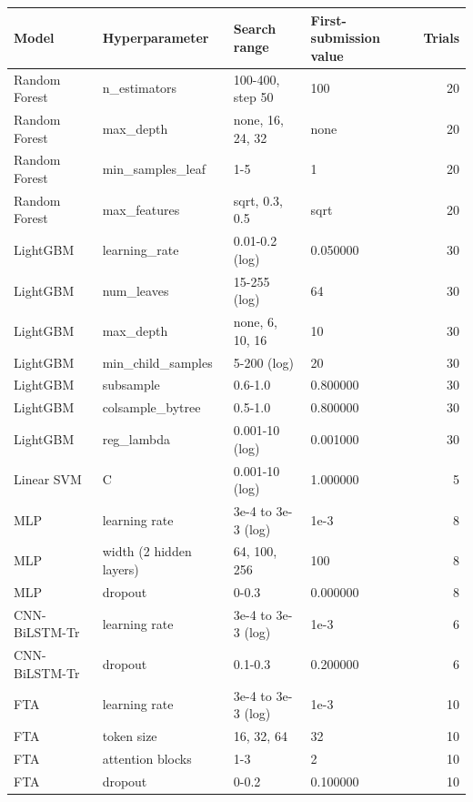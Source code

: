 \begin{tabular}{llllr}
\toprule
Model & Hyperparameter & Search range & First-submission value & Trials \\
\midrule
Random Forest & n\_estimators & 100-400, step 50 & 100 & 20 \\
Random Forest & max\_depth & none, 16, 24, 32 & none & 20 \\
Random Forest & min\_samples\_leaf & 1-5 & 1 & 20 \\
Random Forest & max\_features & sqrt, 0.3, 0.5 & sqrt & 20 \\
LightGBM & learning\_rate & 0.01-0.2 (log) & 0.050000 & 30 \\
LightGBM & num\_leaves & 15-255 (log) & 64 & 30 \\
LightGBM & max\_depth & none, 6, 10, 16 & 10 & 30 \\
LightGBM & min\_child\_samples & 5-200 (log) & 20 & 30 \\
LightGBM & subsample & 0.6-1.0 & 0.800000 & 30 \\
LightGBM & colsample\_bytree & 0.5-1.0 & 0.800000 & 30 \\
LightGBM & reg\_lambda & 0.001-10 (log) & 0.001000 & 30 \\
Linear SVM & C & 0.001-10 (log) & 1.000000 & 5 \\
MLP & learning rate & 3e-4 to 3e-3 (log) & 1e-3 & 8 \\
MLP & width (2 hidden layers) & 64, 100, 256 & 100 & 8 \\
MLP & dropout & 0-0.3 & 0.000000 & 8 \\
CNN-BiLSTM-Tr & learning rate & 3e-4 to 3e-3 (log) & 1e-3 & 6 \\
CNN-BiLSTM-Tr & dropout & 0.1-0.3 & 0.200000 & 6 \\
FTA & learning rate & 3e-4 to 3e-3 (log) & 1e-3 & 10 \\
FTA & token size & 16, 32, 64 & 32 & 10 \\
FTA & attention blocks & 1-3 & 2 & 10 \\
FTA & dropout & 0-0.2 & 0.100000 & 10 \\
\bottomrule
\end{tabular}
